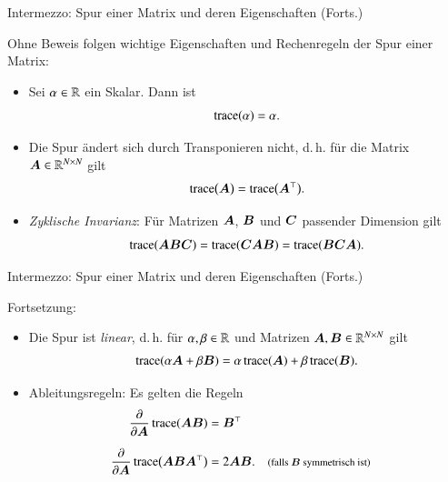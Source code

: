\begin{frame}{Intermezzo: Spur einer Matrix und deren Eigenschaften (Forts.)}{}
	\begin{boxGray}
		Ohne Beweis folgen wichtige Eigenschaften und Rechenregeln der Spur einer Matrix:
		\begin{itemize}
			\item Sei $\alpha \in \mathbb{R}$ ein Skalar. Dann ist
			\begin{equation} \label{eq:ppca-trace-scalar}
				\operatorname{\text{trace}}(\alpha) = \alpha.
			\end{equation}
			\item Die Spur ändert sich durch Transponieren nicht, d.\,h. für die Matrix $\bm{A} \in \mathbb{R}^{N \times N}$ gilt
			\begin{equation} \label{eq:ppca-trace-transpose}
				\operatorname{\text{trace}}\bigl( \bm{A} \bigr) = \operatorname{\text{trace}}\bigl( \bm{A}^\top \bigr).
			\end{equation}
			\item \textit{Zyklische Invarianz}: Für Matrizen $\bm{A}$, $\bm{B}$ und $\bm{C}$ passender Dimension gilt
			\begin{equation} \label{eq:ppca-trace-cyclic}
				\operatorname{\text{trace}}(\bm{A} \bm{B} \bm{C}) = \operatorname{\text{trace}}(\bm{C} \bm{A} \bm{B}) = \operatorname{\text{trace}}(\bm{B} \bm{C} \bm{A}).
			\end{equation}
		\end{itemize}
	\end{boxGray}
\end{frame}

\begin{frame}{Intermezzo: Spur einer Matrix und deren Eigenschaften (Forts.)}{}
	\begin{boxGray}
		Fortsetzung:
		\begin{itemize}
			\item Die Spur ist \textit{linear}, d.\,h. für $\alpha, \beta \in \mathbb{R}$ und Matrizen $\bm{A}, \bm{B} \in \mathbb{R}^{N \times N}$ gilt
			\begin{equation} \label{eq:ppca-trace-linear}
				\operatorname{\text{trace}}(\alpha \bm{A} + \beta \bm{B}) = \alpha \operatorname{\text{trace}}(\bm{A}) + \beta \operatorname{\text{trace}}(\bm{B}).
			\end{equation}
			\item Ableitungsregeln: Es gelten die Regeln
			\begin{align}
			\label{eq:ppca-trace-derivative-1}
				\frac{\partial}{\partial \bm{A}} \operatorname{\text{trace}}(\bm{A} \bm{B})
					&= \bm{B}^\top
			\\[2mm]
			\label{eq:ppca-trace-derivative-2}
				 \frac{\partial}{\partial \bm{A}} \operatorname{\text{trace}}\bigl( \bm{A} \bm{B} \bm{A}^\top \bigr)
				 	&= 2 \bm{A} \bm{B}.
					&&\footnotesize \text{(falls $\bm{B}$ symmetrisch ist)}
			\end{align} 
		\end{itemize}
	\end{boxGray}
\end{frame}


